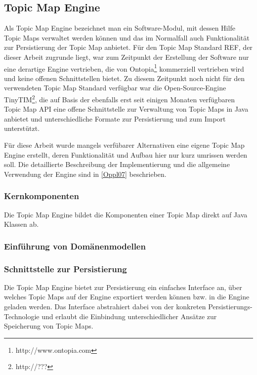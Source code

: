\subsection{Topic Map Engine}

Als Topic Map Engine bezeichnet man ein Software-Modul, mit dessen Hilfe Topic Maps verwaltet werden können und das im Normalfall auch Funktionalität zur Persistierung der Topic Map anbietet. Für den Topic Map Standard REF, der dieser Arbeit zugrunde liegt, war zum Zeitpunkt der Erstellung der Software nur eine derartige Engine vertrieben, die von Ontopia\footnote{http://www.ontopia.com} kommerziell vertrieben wird und keine offenen Schnittstellen bietet. Zu diesem Zeitpunkt noch nicht für den verwendeten Topic Map Standard verfügbar war die Open-Source-Engine TinyTIM\footnote{http://???}, die auf Basis der ebenfalls erst seit einigen Monaten verfügbaren Topic Map \gls{API} eine offene Schnittstelle zur Verwaltung von Topic Maps in Java anbietet und unterschiedliche Formate zur Persistierung und zum Import unterstützt.

Für diese Arbeit wurde mangels verfübarer Alternativen eine eigene Topic Map Engine erstellt, deren Funktionalität und Aufbau hier nur kurz umrissen werden soll. Die detaillierte Beschreibung der Implementierung und die allgemeine Verwendung der Engine sind in \ref{Oppl07} beschrieben.

\subsubsection{Kernkomponenten}

Die Topic Map Engine bildet die Komponenten einer Topic Map direkt auf Java Klassen ab.

\subsubsection{Einführung von Domänenmodellen}

\subsubsection{Schnittstelle zur Persistierung}

Die Topic Map Engine bietet zur Persistierung ein einfaches Interface an, über welches Topic Maps auf der Engine exportiert werden können bzw. in die Engine geladen werden. Das Interface abstrahiert dabei von der konkreten Persistierungs-Technologie und erlaubt die Einbindung unterschiedlicher Ansätze zur Speicherung von Topic Maps.

